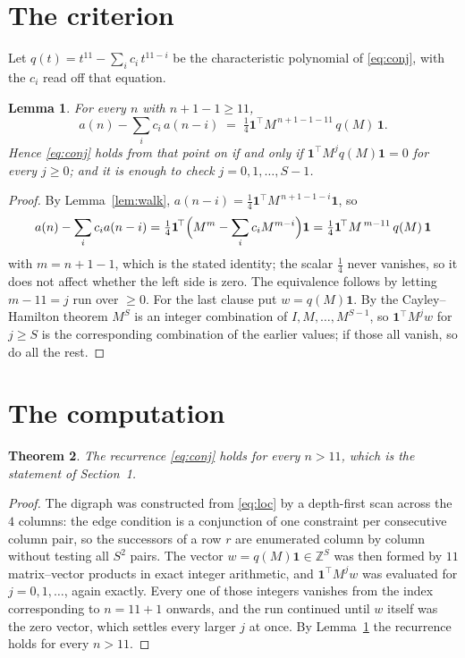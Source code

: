 \documentclass[11pt,a4paper]{article}
\theoremstyle{plain}
\newtheorem{theorem}{Theorem}
\newtheorem{lemma}[theorem]{Lemma}
\theoremstyle{definition}
\begin{document}
\section{The criterion}

Let $q(t)=t^{11}-\sum_i c_i\,t^{11-i}$ be the characteristic polynomial of
\eqref{eq:conj}, with the $c_i$ read off that equation.

\begin{lemma}\label{lem:crit}
For every $n$ with $n+1-1\ge11$,
\[
a(n)-\sum_i c_i\,a(n-i)\;=\;\tfrac1{4}\mathbf{1}^{\!\top}M^{\,n+1-1-11}\,q(M)\,\mathbf{1} .
\]
Hence \eqref{eq:conj} holds from that point on if and only if
$\mathbf{1}^{\!\top}M^{j}q(M)\mathbf{1}=0$ for every $j\ge0$; and it is enough to check
$j=0,1,\dots,S-1$.
\end{lemma}

\begin{proof}
By Lemma~\ref{lem:walk}, $a(n-i)=\tfrac1{4}\mathbf{1}^{\!\top}M^{\,n+1-1-i}\mathbf{1}$, so
\[
a(n)-\sum_i c_i a(n-i)
=\tfrac1{4}\mathbf{1}^{\!\top}\Bigl(M^{m}-\sum_i c_i M^{m-i}\Bigr)\mathbf{1}
=\tfrac1{4}\mathbf{1}^{\!\top}M^{\,m-11}\,q(M)\,\mathbf{1}
\]
with $m=n+1-1$, which is the stated identity; the scalar $\tfrac1{4}$ never vanishes, so
it does not affect whether the left side is zero. The equivalence follows by letting
$m-11=j$ run over $\ge0$. For the last clause put $w=q(M)\mathbf{1}$. By the
Cayley--Hamilton theorem $M^{S}$ is an integer combination of $I,M,\dots,M^{S-1}$, so
$\mathbf{1}^{\!\top}M^{j}w$ for $j\ge S$ is the corresponding combination of the earlier
values; if those all vanish, so do all the rest.
\end{proof}

\section{The computation}

\begin{theorem}
The recurrence \eqref{eq:conj} holds for every $n>11$, which is the statement of
Section~1.
\end{theorem}

\begin{proof}
The digraph was constructed from \eqref{eq:loc} by a depth-first scan across the $4$
columns: the edge condition is a conjunction of one constraint per consecutive column
pair, so the successors of a row $r$ are enumerated column by column without testing all
$S^2$ pairs. The vector $w=q(M)\mathbf{1}\in\mathbb{Z}^{S}$ was then formed by $11$
matrix--vector products in exact integer arithmetic, and $\mathbf{1}^{\!\top}M^{j}w$ was
evaluated for $j=0,1,\dots$, again exactly. Every one of those integers vanishes from the
index corresponding to $n=11+1$ onwards, and the run continued until $w$ itself was the
zero vector, which settles every larger $j$ at once. By Lemma~\ref{lem:crit} the recurrence
holds for every $n>11$.
\end{proof}
\end{document}
